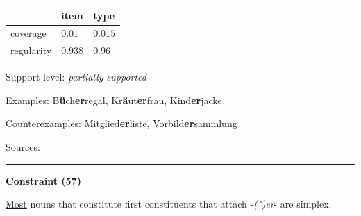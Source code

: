 \vspace{-0.35em}

\begin{table}[!ht]
\begin{center}

\begin{tabularx}{\columnwidth}{|X|X|X|}
\hline
 & item & type \\
\hline
 coverage & $0.01$ & $0.015$ \\
\hline
 regularity & $0.938$ & $0.96$ \\
\hline
\end{tabularx}
\end{center}
\end{table}

\vspace{-1.35em}

\noindent
Support level: \textit{partially supported}

\vspace{0.3em}

\noindent
Examples: B\textbf{ü}ch\textbf{er}regal, Kr\textbf{ä}ut\textbf{er}frau, Kind\textbf{er}jacke

\noindent
Counterexamples: Mitglied\textbf{er}liste, Vorbild\textbf{er}sammlung

\vspace{0.3em}

\noindent
Sources: \citet[9, 11]{kuerschner_2010}


\hrule




\vspace{0.4em}

\begin{center}
\textbf{Constraint (57)}
\end{center}

\noindent
\underline{Most} nouns that constitute first constituents that attach -\textit{(")er}- are simplex.
\vspace{0.35em}


